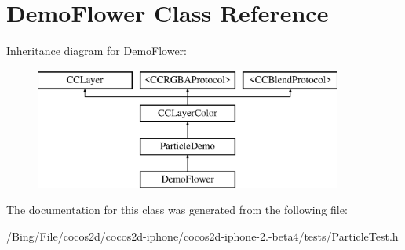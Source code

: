 \hypertarget{interface_demo_flower}{\section{Demo\-Flower Class Reference}
\label{interface_demo_flower}
}
Inheritance diagram for Demo\-Flower\-:\begin{figure}[H]
\begin{center}
\leavevmode
\includegraphics[height=4.000000cm]{interface_demo_flower}
\end{center}
\end{figure}


The documentation for this class was generated from the following file\-:\begin{DoxyCompactItemize}
\item 
/\-Bing/\-File/cocos2d/cocos2d-\/iphone/cocos2d-\/iphone-\/2.-\/beta4/tests/Particle\-Test.\-h\end{DoxyCompactItemize}
